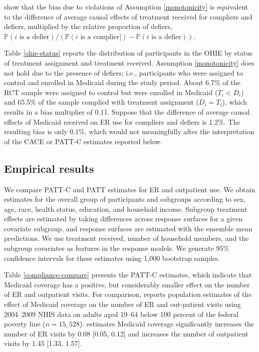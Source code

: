 \documentclass[hidelinks,12pt]{article}
\newcommand{\pr}{\mathbb{P}} %
\begin{document}
\citet{Angrist1996} show that the bias due to violations of Assumption \eqref{monotonicity} is equivalent to the difference of average causal effects of treatment received for compliers and defiers, multiplied by the relative proportion of defiers, 
$\pr(i\text{ is a defier}) / (\pr(i\text{ is a complier]}) - \pr(i\text{ is a defier})).$

Table \ref{ohie-status} reports the distribution of participants in the OHIE by status of treatment assignment and treatment received. Assumption \eqref{monotonicity} does not hold due to the presence of defiers; i.e., participants who were assigned to control and enrolled in Medicaid during the study period. About 6.7\% of the RCT sample were assigned to control but were enrolled in Medicaid ($T_i < D_i$) and 65.5\% of the sample complied with treatment assignment ($D_i = T_i$), which results in a bias multiplier of 0.11. Suppose that the difference of average causal effects of Medicaid received on ER use for compliers and defiers is 1.2\%. The resulting bias is only 0.1\%, which would not meaningfully alter the interpretation of the CACE or PATT-C estimates reported below. 
 
\subsection{Empirical results}\label{results}

We compare PATT-C and PATT estimates for ER and outpatient use. We obtain estimates for the overall group of participants and subgroups according to sex, age, race, health status, education, and household income. Subgroup treatment effects are estimated by taking differences across response surfaces for a given covariate subgroup, and response surfaces are estimated with the ensemble mean predictions. We use treatment received, number of household members, and the subgroup covariates as features in the response models. We generate 95\% confidence intervals for these estimates using 1,000 bootstrap samples. 

Table \ref{compliance-compare} presents the PATT-C estimates, which indicate that Medicaid coverage has a positive, but considerably smaller effect on the number of ER and outpatient visits. For comparison, \citet{finkelstein2012} reports population estimates of the effect of Medicaid coverage on the number of ER and out-patient visits using 2004--2009 NHIS data on adults aged 19--64 below 100 percent of the federal poverty line ($n=15,528$). \citet{finkelstein2012} estimates Medicaid coverage significantly increases the number of ER visits by 0.08 [0.05, 0.12] and increases the number of outpatient visits by 1.45 [1.33, 1.57]. 
\end{document}
